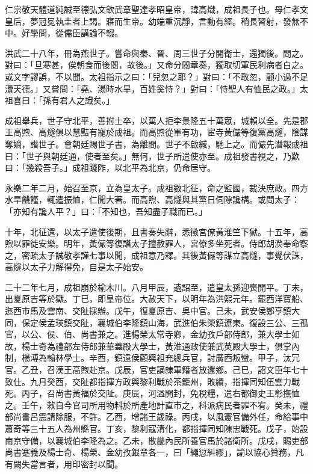 
\begin{pinyinscope}
仁宗敬天體道純誠至德弘文欽武章聖達孝昭皇帝，諱高熾，成祖長子也。母仁孝文皇后，夢冠冕執圭者上謁。寤而生帝。幼端重沉靜，言動有經。稍長習射，發無不中。好學問，從儒臣講論不輟。

洪武二十八年，冊為燕世子。嘗命與秦、晉、周三世子分閱衛士，還獨後。問之。對曰：「旦寒甚，俟朝食而後閱，故後。」又命分閱章奏，獨取切軍民利病者白之。或文字謬誤，不以聞。太祖指示之曰：「兒忽之耶？」對曰：「不敢忽，顧小過不足瀆天德。」又嘗問：「堯、湯時水旱，百姓奚恃？」對曰：「恃聖人有恤民之政。」太祖喜曰：「孫有君人之識矣。」

成祖舉兵，世子守北平，善拊士卒，以萬人拒李景隆五十萬眾，城賴以全。先是郡王高煦、高燧俱以慧黠有寵於成祖。而高煦從軍有功，宦寺黃儼等復黨高燧，陰謀奪嫡，譖世子。會朝廷賜世子書，為離間。世子不啟緘，馳上之。而儼先潛報成祖曰：「世子與朝廷通，使者至矣。」無何，世子所遣使亦至。成祖發書視之，乃歎曰：「幾殺吾子。」成祖踐阼，以北平為北京，仍命居守。

永樂二年二月，始召至京，立為皇太子。成祖數北征，命之監國，裁決庶政。四方水旱饑饉，輒遣振恤，仁聞大著。而高煦、高燧與其黨日伺隙讒構。或問太子：「亦知有讒人平？」曰：「不知也，吾知盡子職而已。」

十年，北征還，以太子遣使後期，且書奏失辭，悉徵宮僚黃淮竺下獄。十五年，高煦以罪徙安樂。明年，黃儼等復譖太子擅赦罪人，宮僚多坐死者。侍郎胡濙奉命察之，密疏太子誠敬孝謹七事以聞，成祖意乃釋。其後黃儼等謀立高燧，事覺伏誅，高燧以太子力解得免，自是太子始安。

二十二年七月，成祖崩於榆木川。八月甲辰，遺詔至，遣皇太孫迎喪開平。丁未，出夏原吉等於獄。丁巳，即皇帝位。大赦天下，以明年為洪熙元年。罷西洋寶船、迤西市馬及雲南、交阯採辦。戊午，復夏原吉、吳中官。己未，武安侯鄭亨鎮大同，保定侯孟瑛鎮交阯，襄城伯李隆鎮山海，武進伯朱榮鎮遼東。復設三公、三孤官，以公、侯、伯、尚書兼之。進楊榮太常寺卿，金幼孜戶部侍郎，兼大學士如故，楊士奇為禮部左侍郎兼華蓋殿大學士，黃淮通政使兼武英殿大學士，俱掌內制，楊溥為翰林學士。辛酉，鎮遠侯顧興祖充總兵官，討廣西叛蠻。甲子，汰冗官。乙丑，召漢王高煦赴京。戊辰，官吏謫隸軍籍者放還鄉。己巳，詔文臣年七十致仕。九月癸酉，交阯都指揮方政與黎利戰於茶籠州，敗績，指揮同知伍雲力戰死。丙子，召尚書黃福於交阯。庚辰，河溢開封，免稅糧，遣右都御史王彰撫恤之。壬午，敕自今官司所用物料於所產地計直市之，科派病民者罪不宥。癸未，禮部尚書呂震請除服，不許。乙酉，增諸王歲祿。丙戌，以風憲官備外任，命給事中蕭奇等三十五人為州縣官。丁亥，黎利寇清化，都指揮同知陳忠戰死。戊子，始設南京守備，以襄城伯李隆為之。乙未，散畿內民所養官馬於諸衛所。戊戌，賜吏部尚書蹇義及楊士奇、楊榮、金幼孜銀章各一，曰「繩愆糾繆」，諭以協心贊務，凡有闕失當言者，用印密封以聞。


\end{pinyinscope}
